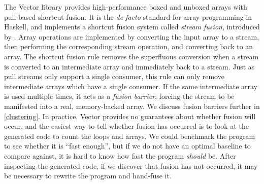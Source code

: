 The Vector library provides high-performance boxed and unboxed arrays with pull-based shortcut fusion.
It is the \emph{de facto} standard for array programming in Haskell, and implements a shortcut fusion system called \emph{stream fusion}, introduced by \citet{coutts2007stream}.
Array operations are implemented by converting the input array to a stream, then performing the corresponding stream operation, and converting back to an array.
The shortcut fusion rule removes the superfluous conversion when a stream is converted to an intermediate array and immediately back to a stream.
Just as pull streams only support a single consumer, this rule can only remove intermediate arrays which have a single consumer.
If the same intermediate array is used multiple times, it acts as a \emph{fusion barrier}, forcing the stream to be manifested into a real, memory-backed array.
We discuss fusion barriers further in \cref{clustering}.
In practice, Vector provides no guarantees about whether fusion will occur, and the easiest way to tell whether fusion has occurred is to look at the generated code to count the loops and arrays.
We could benchmark the program to see whether it is ``fast enough'', but if we do not have an optimal baseline to compare against, it is hard to know how fast the program \emph{should} be.
After inspecting the generated code, if we discover that fusion has not occurred, it may be necessary to rewrite the program and hand-fuse it.


